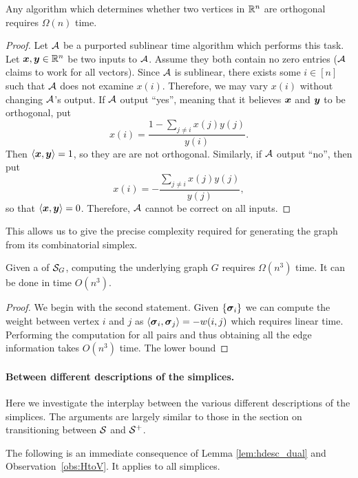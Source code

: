 \begin{observation}
	Any algorithm which  determines whether two vertices in  $\mathbb{R}^n$ are  orthogonal requires  $\Omega(n)$ time. 
\end{observation}
\begin{proof}
	Let $\mathcal{A}$ be a purported sublinear time algorithm which performs this  task. Let $\vb*{x},\vb*{y}\in\mathbb{R}^n$ be  two inputs  to  $\mathcal{A}$. Assume they  both  contain no zero entries ($\mathcal{A}$ claims to work  for  all vectors). Since  $\mathcal{A}$ is sublinear, there exists some $i\in[n]$ such that $\mathcal{A} $ does not  examine $x(i)$. Therefore,  we may  vary $x(i)$ without changing  $\mathcal{A}$'s  output. If $\mathcal{A}$ output ``yes'', meaning that it believes $\vb*{x}$ and $\vb*{y}$ to be orthogonal, put 
	\[x(i) = \frac{1-\sum_{j\neq i}x(j)y(j)}{y(i)}.\]
	Then  $\langle \vb*{x},\vb*{y}\rangle =1$, so they are are not orthogonal. Similarly,  if $\mathcal{A}$ output ``no'', then put 
	\[x(i) = -\frac{\sum_{j\neq i}x(j)y(j)}{y(j)},\]
	so  that $\langle\vb*{x},\vb*{y}\rangle=0$. Therefore, $\mathcal{A}$ cannot  be  correct on all inputs.  
\end{proof}

This allows us to give the precise complexity required for  generating the graph from its  combinatorial  simplex.  

\begin{lemma}
	Given a  \vdesc  of  $\mathcal{S}_G$,  computing the underlying graph  $G$ requires $\Omega(n^3)$ time. It can be done in time $O(n^3)$. 
\end{lemma}
\begin{proof}
	We begin with the second statement. Given $\{\vb*{\sigma}_i\}$ we can compute the weight between vertex $i$ and  $j$ as  $\langle \vb*{\sigma}_i,\vb*{\sigma}_j\rangle=-w(i,j)$ which  requires linear time. Performing the computation for all pairs and thus obtaining all the edge information takes $O(n^3)$  time. 
	The lower  bound 
\end{proof}




\paragraph{Between different descriptions of the simplices.}
Here we investigate  the interplay between the various different descriptions of the simplices. The  arguments are largely similar  to those in the section on  transitioning between  $\mathcal{S}$ and $\mathcal{S}^+$. 

The following is an immediate consequence of Lemma \ref{lem:hdesc_dual} and Observation~\ref{obs:HtoV}. It applies to all simplices.  

